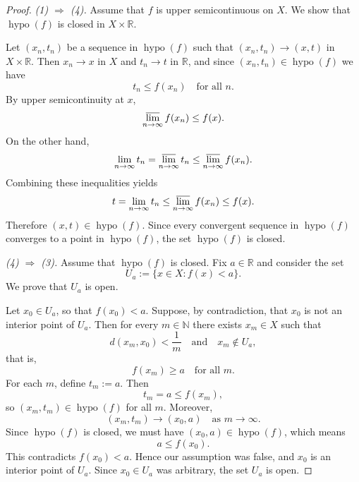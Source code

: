 \documentclass[12pt]{article}
\renewcommand{\(}{\left(}%
\renewcommand{\)}{\right)}%
\renewcommand{\[}{\left[}%
\renewcommand{\]}{\right]}%
\newtheorem{proof}{Proof.}}
\begin{document}
\begin{proof}
\medskip

\emph{(1) $\Rightarrow$ (4).}
Assume that $f$ is upper semicontinuous on $X$.
We show that $\operatorname{hypo}(f)$ is closed in $X\times\mathbb{R}$.

Let $(x_n,t_n)$ be a sequence in $\operatorname{hypo}(f)$ such that
$(x_n,t_n) \to (x,t)$ in $X\times\mathbb{R}$.
Then $x_n \to x$ in $X$ and $t_n \to t$ in $\mathbb{R}$, and since
$(x_n,t_n)\in \operatorname{hypo}(f)$ we have
\begin{equation*}
t_n \leq f(x_n)
\quad\text{for all } n.
\end{equation*}
By upper semicontinuity at $x$,
\begin{equation*}
\varlimsup_{n\to\infty} f(x_n) \leq f(x).
\end{equation*}
On the other hand,
\begin{equation*}
\lim_{n\to\infty}t_n=\varlimsup_{n\to\infty} t_n \leq \varlimsup_{n\to\infty} f(x_n).
\end{equation*}
Combining these inequalities yields
\begin{equation*}
t = \lim_{n\to\infty} t_n
\leq
\varlimsup_{n\to\infty} f(x_n)
\leq f(x).
\end{equation*}
Therefore $(x,t)\in\operatorname{hypo}(f)$.
Since every convergent sequence in $\operatorname{hypo}(f)$ converges
to a point in $\operatorname{hypo}(f)$, the set
$\operatorname{hypo}(f)$ is closed.

\medskip

\emph{(4) $\Rightarrow$ (3).}
Assume that $\operatorname{hypo}(f)$ is closed.
Fix $a\in\mathbb{R}$ and consider the set
\begin{equation*}
U_a := \{x\in X : f(x) < a\}.
\end{equation*}
We prove that $U_a$ is open.

Let $x_0\in U_a$, so that $f(x_0) < a$.
Suppose, by contradiction, that $x_0$ is not an interior point of
$U_a$.
Then for every $m\in\mathbb{N}$ there exists $x_m\in X$ such that
\begin{equation*}
d(x_m,x_0) < \frac{1}{m}
\quad\text{and}\quad
x_m \notin U_a,
\end{equation*}
that is,
\begin{equation*}
f(x_m) \geq a
\quad\text{for all } m.
\end{equation*}
For each $m$, define $t_m := a$.
Then
\begin{equation*}
t_m = a \leq f(x_m),
\end{equation*}
so $(x_m,t_m)\in\operatorname{hypo}(f)$ for all $m$.
Moreover,
\begin{equation*}
(x_m,t_m) \to (x_0,a) \quad\text{as } m\to\infty.
\end{equation*}
Since $\operatorname{hypo}(f)$ is closed, we must have
$(x_0,a)\in\operatorname{hypo}(f)$, which means
\begin{equation*}
a \leq f(x_0).
\end{equation*}
This contradicts $f(x_0) < a$.
Hence our assumption was false, and $x_0$ is an interior point of
$U_a$.
Since $x_0\in U_a$ was arbitrary, the set $U_a$ is open.
\end{proof}
\end{document}
